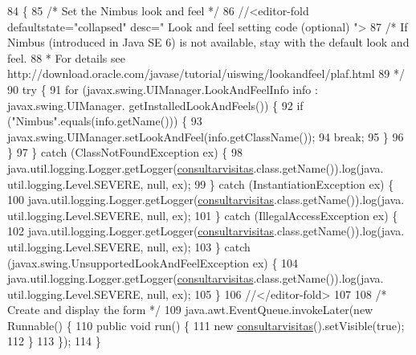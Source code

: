\begin{DoxyCode}
84                                            \{
85         \textcolor{comment}{/* Set the Nimbus look and feel */}
86         \textcolor{comment}{//<editor-fold defaultstate="collapsed" desc=" Look and feel setting code (optional) ">}
87         \textcolor{comment}{/* If Nimbus (introduced in Java SE 6) is not available, stay with the default look and feel.}
88 \textcolor{comment}{         * For details see http://download.oracle.com/javase/tutorial/uiswing/lookandfeel/plaf.html }
89 \textcolor{comment}{         */}
90         \textcolor{keywordflow}{try} \{
91             \textcolor{keywordflow}{for} (javax.swing.UIManager.LookAndFeelInfo info : javax.swing.UIManager.
      getInstalledLookAndFeels()) \{
92                 \textcolor{keywordflow}{if} (\textcolor{stringliteral}{"Nimbus"}.equals(info.getName())) \{
93                     javax.swing.UIManager.setLookAndFeel(info.getClassName());
94                     \textcolor{keywordflow}{break};
95                 \}
96             \}
97         \} \textcolor{keywordflow}{catch} (ClassNotFoundException ex) \{
98             java.util.logging.Logger.getLogger(\mbox{\hyperlink{classinterfacessoguar_1_1consultarvisitas_a88f7aaa7f944326398e3be28f0f046b7}{consultarvisitas}}.class.getName()).log(java.
      util.logging.Level.SEVERE, null, ex);
99         \} \textcolor{keywordflow}{catch} (InstantiationException ex) \{
100             java.util.logging.Logger.getLogger(\mbox{\hyperlink{classinterfacessoguar_1_1consultarvisitas_a88f7aaa7f944326398e3be28f0f046b7}{consultarvisitas}}.class.getName()).log(java.
      util.logging.Level.SEVERE, null, ex);
101         \} \textcolor{keywordflow}{catch} (IllegalAccessException ex) \{
102             java.util.logging.Logger.getLogger(\mbox{\hyperlink{classinterfacessoguar_1_1consultarvisitas_a88f7aaa7f944326398e3be28f0f046b7}{consultarvisitas}}.class.getName()).log(java.
      util.logging.Level.SEVERE, null, ex);
103         \} \textcolor{keywordflow}{catch} (javax.swing.UnsupportedLookAndFeelException ex) \{
104             java.util.logging.Logger.getLogger(\mbox{\hyperlink{classinterfacessoguar_1_1consultarvisitas_a88f7aaa7f944326398e3be28f0f046b7}{consultarvisitas}}.class.getName()).log(java.
      util.logging.Level.SEVERE, null, ex);
105         \}
106         \textcolor{comment}{//</editor-fold>}
107 
108         \textcolor{comment}{/* Create and display the form */}
109         java.awt.EventQueue.invokeLater(\textcolor{keyword}{new} Runnable() \{
110             \textcolor{keyword}{public} \textcolor{keywordtype}{void} run() \{
111                 \textcolor{keyword}{new} \mbox{\hyperlink{classinterfacessoguar_1_1consultarvisitas_a88f7aaa7f944326398e3be28f0f046b7}{consultarvisitas}}().setVisible(\textcolor{keyword}{true});
112             \}
113         \});
114     \}
\end{DoxyCode}


